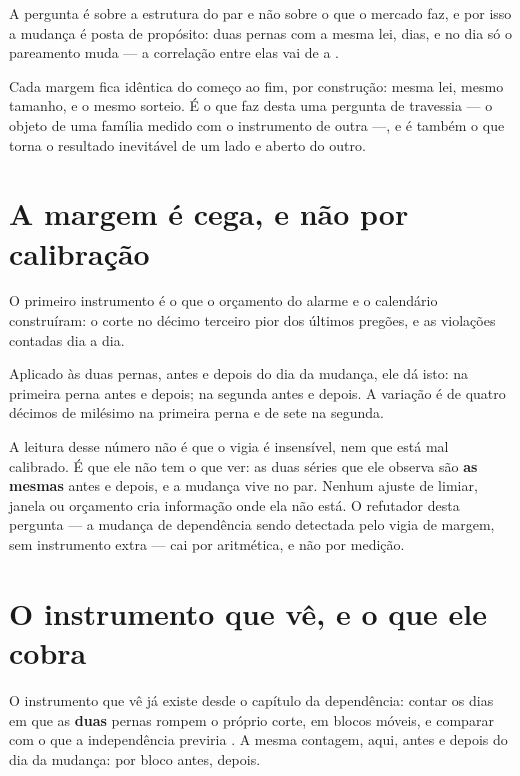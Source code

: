 A pergunta é sobre a estrutura do par e não sobre o que o mercado faz, e por isso a mudança é posta de
propósito: duas pernas com a mesma lei, \numVizinhancaDias{} dias, e no dia
\numVizinhancaQuando{} só o pareamento muda --- a correlação entre elas vai de
\numVizinhancaRhoAntes{} a \numVizinhancaRhoDepois.

Cada margem fica idêntica do começo ao fim, por construção: mesma lei, mesmo tamanho, e o mesmo
sorteio. É o que faz desta uma pergunta de travessia --- o objeto de uma família medido com o
instrumento de outra ---, e é também o que torna o resultado inevitável de um lado e aberto do
outro.

\section{A margem é cega, e não por calibração}

O primeiro instrumento é o que o orçamento do alarme e o calendário construíram: o corte no décimo terceiro pior dos
últimos \numCorteJanela{} pregões, e as violações contadas dia a dia.

Aplicado às duas pernas, antes e depois do dia da mudança, ele dá isto: \numVizinhancaTaxaAAntes{}
na primeira perna antes e \numVizinhancaTaxaADepois{} depois; \numVizinhancaTaxaBAntes{} na segunda
antes e \numVizinhancaTaxaBDepois{} depois. A variação é de quatro décimos de milésimo na primeira perna e de sete na segunda.

A leitura desse número não é que o vigia é insensível, nem que está mal calibrado. É que ele não
tem o que ver: as duas séries que ele observa são \textbf{as mesmas} antes e depois, e a mudança vive
no par. Nenhum ajuste de limiar, janela ou orçamento cria informação onde ela não está. O
refutador desta pergunta --- a mudança de dependência sendo detectada pelo vigia de margem, sem
instrumento extra --- cai por aritmética, e não por medição.

\section{O instrumento que vê, e o que ele cobra}

O instrumento que vê já existe desde o capítulo da dependência: contar os dias em que as \textbf{duas}
pernas rompem o próprio corte, em blocos móveis, e comparar com o que a independência previria
\cite{garcin2026nonparametric}. A
mesma contagem, aqui, antes e depois do dia da mudança: \numVizinhancaConjuntoAntes{} por bloco
antes, \numVizinhancaConjuntoDepois{} depois.

